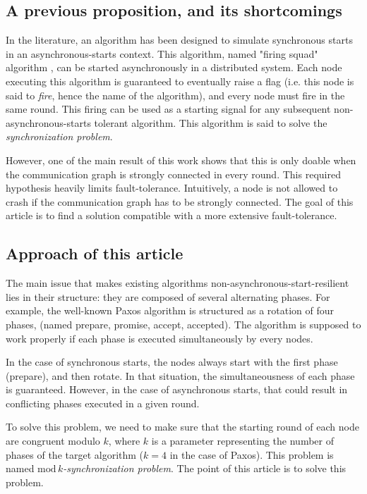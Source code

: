 \documentclass{article}
\begin{document}
\subsection{A previous proposition, and its shortcomings}

In the literature, an algorithm has been designed to simulate synchronous starts in an asynchronous-starts context.
This algorithm, named "firing squad" algorithm \cite{firing_squad}, can be started asynchronously in a distributed system.
Each node executing this algorithm is guaranteed to eventually raise a flag (i.e. this node is said to \textit{fire}, hence the name of the algorithm), and every node must fire in the same round.
This firing can be used as a starting signal for any subsequent non-asynchronous-starts tolerant algorithm.
This algorithm is said to solve the \textit{synchronization problem}.

However, one of the main result of this work shows that this is only doable when the communication graph is strongly connected in every round.
This required hypothesis heavily limits fault-tolerance. Intuitively, a node is not allowed to crash if the communication graph has to be strongly connected.
The goal of this article is to find a solution compatible with a more extensive fault-tolerance.

\subsection{Approach of this article}

The main issue that makes existing algorithms non-asynchronous-start-resilient lies in their structure:
they are composed of several alternating phases.
For example, the well-known Paxos \cite{paxos} algorithm is structured as a rotation of four phases, (named prepare,
promise, accept, accepted).
The algorithm is supposed to work properly if each phase is executed simultaneously by every nodes.

In the case of synchronous starts, the nodes always start with the first phase (prepare), and then rotate.
In that situation, the simultaneousness of each phase is guaranteed.
However, in the case of asynchronous starts, that could result in conflicting phases executed in a given round.

To solve this problem, we need to make sure that the starting round of each node are congruent modulo $k$,
where $k$ is a parameter representing the number of phases of the target algorithm ($k=4$ in the case of Paxos).
This problem is named \emph{$\mathrm{mod}\,k$-synchronization problem}.
The point of this article is to solve this problem.
\end{document}
